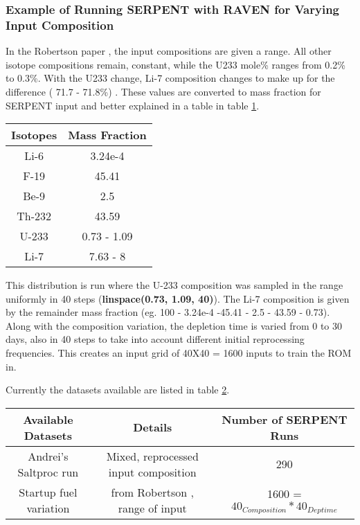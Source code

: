 \documentclass{article}
\begin{document}
\subsubsection{Example of Running SERPENT with RAVEN for Varying Input Composition}
In the Robertson paper \cite{robertson_conceptual_1971}, the
input compositions are given a range. All other isotope
compositions remain, constant, while the U233
mole\% ranges from 0.2\% to 0.3\%. With the U233 change,
Li-7 composition changes to make up
for the difference ( 71.7 - 71.8\%) .
These values are converted  to mass fraction
for SERPENT input and better explained in a table in table \ref{tab:comp}.
\begin{table}
\begin{center}
\begin{tabular}{ c c }
    \hline
    Isotopes & Mass Fraction \\
    \hline
    Li-6 & 3.24e-4 \\
    F-19 & 45.41 \\
    Be-9 & 2.5 \\ 
    Th-232 & 43.59 \\
    U-233 & 0.73 - 1.09 \\
    Li-7 & 7.63 - 8\\
    \hline
\end{tabular}
\label{tab:comp}
\end{center}
\end{table}

This distribution is run where the U-233 composition was
sampled in the range uniformly in 40 steps 
(\textbf{linspace(0.73, 1.09, 40)}). The Li-7 composition
is given by the remainder mass fraction 
(eg. 100 - 3.24e-4 -45.41 - 2.5 - 43.59 - 0.73).
Along with the composition variation,
the depletion time is varied from 0 to 30 days, also
in 40 steps to take into account
different initial reprocessing frequencies.
This creates an input grid of 40X40 = 1600 inputs to
train the ROM in.

Currently the datasets available are listed in table \ref{tab:data}.

\begin{table}
\begin{center}
\begin{tabular}{ c c c}
    \hline
    Available Datasets & Details & Number of SERPENT Runs \\
    \hline
    Andrei's Saltproc run & Mixed, reprocessed input composition & 290 \\
    Startup fuel variation & from Robertson \cite{robertson_conceptual_1971}, range of input & 1600 = $40_{Composition} * 40_{Deptime}$ \\
    \hline
\end{tabular}
\label{tab:data}
\end{center}
\end{table}
\end{document}
